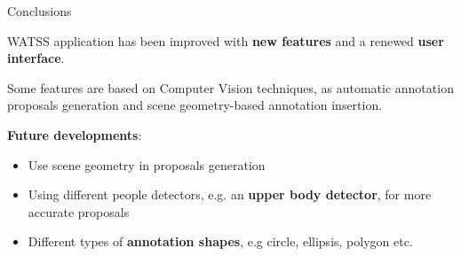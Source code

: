 \documentclass{beamer}
\begin{document}
\begin{tframe}{Conclusions}

WATSS application has been improved with \textbf{new features} and a renewed \textbf{user interface}.
\vspace{0.2cm}

Some features are based on Computer Vision techniques, as automatic annotation proposals generation and scene geometry-based annotation insertion.
\vspace{0.4cm}

\textbf{Future developments}:
\vspace{0.2cm}
\begin{itemize}
\item Use scene geometry in proposals generation
\vspace{0.2cm}
\item Using different people detectors, e.g. an \textbf{upper body detector}, for more accurate proposals
\vspace{0.2cm}
\item Different types of \textbf{annotation shapes}, e.g circle, ellipsis, polygon etc.
\end{itemize}

\end{tframe}
\end{document}
